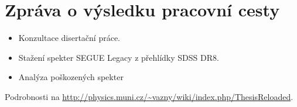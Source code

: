 \documentclass{article}
\begin{document}
\title{}
\author{Jaroslav Vážný}


\section*{Zpráva o výsledku pracovní cesty}

\begin{itemize}
\item Konzultace  disertační práce. 
\item Stažení spekter SEGUE Legacy z přehlídky SDSS DR8. 
\item Analýza poškozených spekter 
\end{itemize}


\noindent Podrobnosti na \url{http://physics.muni.cz/~vazny/wiki/index.php/ThesisReloaded}.

\bigskip

\end{document}
